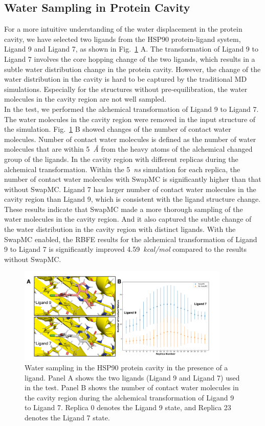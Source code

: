 \documentclass[journal=jacsat,manuscript=article]{achemso}
\begin{document}
\subsection{Water Sampling in Protein Cavity}
For a more intuitive understanding of the water displacement in the protein cavity, 
we have selected two ligands from the HSP90 protein-ligand system, Ligand 9 and Ligand 7, as shown in Fig.~\ref{fig:hsp90} A.
The transformation of Ligand 9 to Ligand 7 involves the core hopping change of the two ligands,
which results in a subtle water distribution change in the protein cavity.
However, the change of the water distribution in the cavity is hard to be captured by the traditional MD simulations.
Especially for the structures without pre-equilibration, the water molecules in the cavity region are not well sampled.\\
\newline
In the test, we performed the alchemical transformation of Ligand 9 to Ligand 7.
The water molecules in the cavity region were removed in the input structure of the simulation.
Fig.~\ref{fig:hsp90} B showed changes of the number of contact water molecules.
Number of contact water molecules is defined as the number of water molecules that are within 5~\textit{Å} from the heavy atoms of the alchemical changed group of the ligands.
In the cavity region with different replicas during the alchemical transformation.
Within the 5~\textit{ns} simulation for each replica,
the number of contact water molecules with SwapMC is significantly higher than that without SwapMC.
Ligand 7 has larger number of contact water molecules in the cavity region than Ligand 9,
which is consistent with the ligand structure change.
These results indicate that SwapMC made a more thorough sampling of the water molecules in the cavity region.
And it also captured the subtle change of the water distribution in the cavity region with distinct ligands.
With the SwapMC enabled, the RBFE results for the alchemical transformation of Ligand 9 to Ligand 7 is significantly improved 4.59~\textit{kcal/mol} compared to the results without SwapMC.
\begin{figure}
  \includegraphics[width=0.9\textwidth]{figures/hsp90.png}
  \caption{Water sampling in the HSP90 protein cavity in the presence of a ligand. 
  Panel A shows the two ligands (Ligand 9 and Ligand 7) used in the test.
  Panel B shows the number of contact water molecules in the cavity region during the alchemical transformation of Ligand 9 to Ligand 7.
  Replica 0 denotes the Ligand 9 state, and Replica 23 denotes the Ligand 7 state.
  }
  \label{fig:hsp90}
\end{figure}
\end{document}

